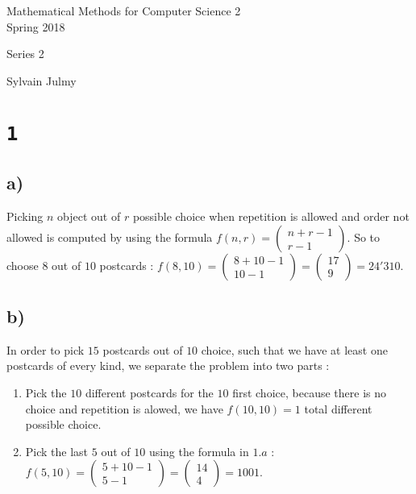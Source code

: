 \documentclass[a4paper,11pt]{report}
\author{Sylvain Julmy}
\date{\today}
\begin{document}
\begin{center}
  \Large{
    Mathematical Methods for Computer Science 2\\
    Spring 2018
  }
  \noindent\makebox[\linewidth]{\rule{\linewidth}{0.4pt}}

  Series 2
  \vspace*{1.4cm}

  Sylvain Julmy
  
  \noindent\makebox[\linewidth]{\rule{\linewidth}{0.4pt}}
\end{center}

\section*{\texttt{1}}
\subsection*{a)}
Picking $n$ object out of $r$ possible choice when repetition is allowed and
order not allowed is computed by using the formula $f(n,r) = \begin{pmatrix}n + r - 1 \\
  r - 1\end{pmatrix}$. So to choose $8$ out of $10$ postcards : $f(8,10)
= \begin{pmatrix} 8+10-1\\ 10-1\end{pmatrix} = \begin{pmatrix} 17\\
  9\end{pmatrix} = 24'310$.

\subsection*{b)}

In order to pick $15$ postcards out of $10$ choice, such that we have at least
one postcards of every kind, we separate the problem into two parts :
\begin{enumerate}
\item Pick the $10$ different postcards for the $10$ first choice, because there
  is no choice and repetition is alowed, we have $f(10,10) = 1$ total different
  possible choice.
\item Pick the last $5$ out of $10$ using the formula in $1.a$ : $f(5,10)
  = \begin{pmatrix} 5 + 10 - 1 \\ 5 - 1\end{pmatrix} = \begin{pmatrix} 14 \\
    4\end{pmatrix} = 1001$.
\end{enumerate}
\end{document}
